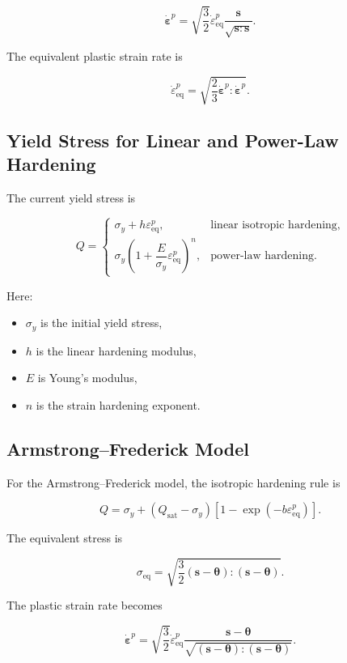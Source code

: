 ﻿\documentclass[11pt,a4paper]{article}
\begin{document}
\[
\dot{\bm{\varepsilon}}^p
=
\sqrt{\frac{3}{2}}
\dot{\varepsilon}_{\mathrm{eq}}^p
\frac{\bm{s}}{\sqrt{\bm{s}:\bm{s}}}.
\]

The equivalent plastic strain rate is

\[
\dot{\varepsilon}_{\mathrm{eq}}^p
=
\sqrt{
\frac{2}{3}
\dot{\bm{\varepsilon}}^p:\dot{\bm{\varepsilon}}^p
}.
\]

\subsection{Yield Stress for Linear and Power-Law Hardening}

The current yield stress is

\[
Q
=
\begin{cases}
\sigma_y + h\varepsilon_{\mathrm{eq}}^p,
& \text{linear isotropic hardening}, \\
\sigma_y
\left(
1+\dfrac{E}{\sigma_y}\varepsilon_{\mathrm{eq}}^p
\right)^n,
& \text{power-law hardening}.
\end{cases}
\]

Here:

\begin{itemize}[leftmargin=*]
    \item $\sigma_y$ is the initial yield stress,
    \item $h$ is the linear hardening modulus,
    \item $E$ is Young's modulus,
    \item $n$ is the strain hardening exponent.
\end{itemize}

\subsection{Armstrong--Frederick Model}

For the Armstrong--Frederick model, the isotropic hardening rule is

\[
Q
=
\sigma_y
+
(Q_{\mathrm{sat}}-\sigma_y)
\left[
1-\exp(-b\varepsilon_{\mathrm{eq}}^p)
\right].
\]

The equivalent stress is

\[
\sigma_{\mathrm{eq}}
=
\sqrt{
\frac{3}{2}
(\bm{s}-\bm{\theta}):(\bm{s}-\bm{\theta})
}.
\]

The plastic strain rate becomes

\[
\dot{\bm{\varepsilon}}^p
=
\sqrt{\frac{3}{2}}
\dot{\varepsilon}_{\mathrm{eq}}^p
\frac{\bm{s}-\bm{\theta}}
{\sqrt{(\bm{s}-\bm{\theta}):(\bm{s}-\bm{\theta})}}.
\]
\end{document}
